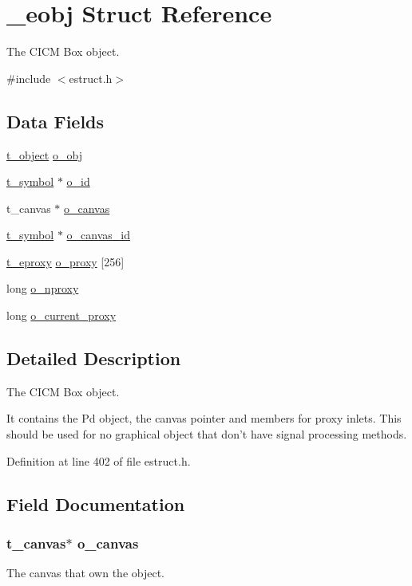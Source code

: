\hypertarget{struct__eobj}{\section{\-\_\-eobj Struct Reference}
\label{struct__eobj}
}


The C\-I\-C\-M Box object.  




{\ttfamily \#include $<$estruct.\-h$>$}

\subsection*{Data Fields}
\begin{DoxyCompactItemize}
\item 
\hyperlink{struct__text}{t\-\_\-object} \hyperlink{struct__eobj_a8cffa8f3338cca7779ab922dab19227c}{o\-\_\-obj}
\item 
\hyperlink{struct__symbol}{t\-\_\-symbol} $\ast$ \hyperlink{struct__eobj_a024c5a2d6d2dcdf531f05a0e711cce68}{o\-\_\-id}
\item 
t\-\_\-canvas $\ast$ \hyperlink{struct__eobj_a4ac1a6544ba0591b83cbf38bc1349e74}{o\-\_\-canvas}
\item 
\hyperlink{struct__symbol}{t\-\_\-symbol} $\ast$ \hyperlink{struct__eobj_ab7f7ce6beaff87d1baca1a619b9a7ebf}{o\-\_\-canvas\-\_\-id}
\item 
\hyperlink{struct__eproxy}{t\-\_\-eproxy} \hyperlink{struct__eobj_a9435dcf0a1aed105a4c38d24dfc65dbf}{o\-\_\-proxy} \mbox{[}256\mbox{]}
\item 
long \hyperlink{struct__eobj_a5959b8f1e0726d2a7d82a4d39ae803bb}{o\-\_\-nproxy}
\item 
long \hyperlink{struct__eobj_a32a8921c66d63fcccc9df035f6b9160f}{o\-\_\-current\-\_\-proxy}
\end{DoxyCompactItemize}


\subsection{Detailed Description}
The C\-I\-C\-M Box object. 

It contains the Pd object, the canvas pointer and members for proxy inlets. This should be used for no graphical object that don't have signal processing methods. 

Definition at line 402 of file estruct.\-h.



\subsection{Field Documentation}
\hypertarget{struct__eobj_a4ac1a6544ba0591b83cbf38bc1349e74}{
\subsubsection[{o\-\_\-canvas}]{\setlength{\rightskip}{0pt plus 5cm}t\-\_\-canvas$\ast$ o\-\_\-canvas}}\label{struct__eobj_a4ac1a6544ba0591b83cbf38bc1349e74}
The canvas that own the object. 


